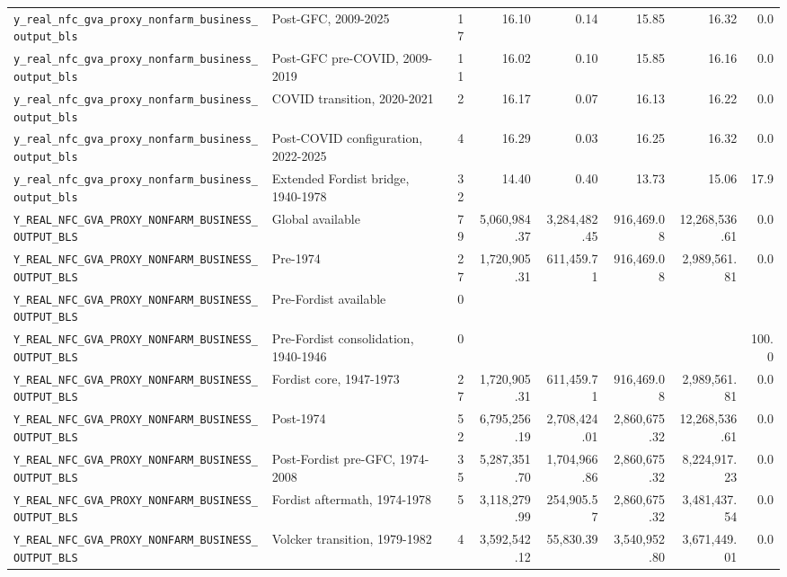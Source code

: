 \begin{landscape}
\begin{longtable}{p{4.4cm}p{3.8cm}rrrrrr}
\\
\nolinkurl{y_real_nfc_gva_proxy_nonfarm_business_output_bls} & Post-GFC, 2009-2025 & 17 & 16.10 & 0.14 & 15.85 & 16.32 & 0.0
\\
\nolinkurl{y_real_nfc_gva_proxy_nonfarm_business_output_bls} & Post-GFC pre-COVID, 2009-2019 & 11 & 16.02 & 0.10 & 15.85 & 16.16 & 0.0
\\
\nolinkurl{y_real_nfc_gva_proxy_nonfarm_business_output_bls} & COVID transition, 2020-2021 & 2 & 16.17 & 0.07 & 16.13 & 16.22 & 0.0
\\
\nolinkurl{y_real_nfc_gva_proxy_nonfarm_business_output_bls} & Post-COVID configuration, 2022-2025 & 4 & 16.29 & 0.03 & 16.25 & 16.32 & 0.0
\\
\nolinkurl{y_real_nfc_gva_proxy_nonfarm_business_output_bls} & Extended Fordist bridge, 1940-1978 & 32 & 14.40 & 0.40 & 13.73 & 15.06 & 17.9
\\
\nolinkurl{Y_REAL_NFC_GVA_PROXY_NONFARM_BUSINESS_OUTPUT_BLS} & Global available & 79 & 5,060,984.37 & 3,284,482.45 & 916,469.08 & 12,268,536.61 & 0.0
\\
\nolinkurl{Y_REAL_NFC_GVA_PROXY_NONFARM_BUSINESS_OUTPUT_BLS} & Pre-1974 & 27 & 1,720,905.31 & 611,459.71 & 916,469.08 & 2,989,561.81 & 0.0
\\
\nolinkurl{Y_REAL_NFC_GVA_PROXY_NONFARM_BUSINESS_OUTPUT_BLS} & Pre-Fordist available & 0 &  &  &  &  &
\\
\nolinkurl{Y_REAL_NFC_GVA_PROXY_NONFARM_BUSINESS_OUTPUT_BLS} & Pre-Fordist consolidation, 1940-1946 & 0 &  &  &  &  & 100.0
\\
\nolinkurl{Y_REAL_NFC_GVA_PROXY_NONFARM_BUSINESS_OUTPUT_BLS} & Fordist core, 1947-1973 & 27 & 1,720,905.31 & 611,459.71 & 916,469.08 & 2,989,561.81 & 0.0
\\
\nolinkurl{Y_REAL_NFC_GVA_PROXY_NONFARM_BUSINESS_OUTPUT_BLS} & Post-1974 & 52 & 6,795,256.19 & 2,708,424.01 & 2,860,675.32 & 12,268,536.61 & 0.0
\\
\nolinkurl{Y_REAL_NFC_GVA_PROXY_NONFARM_BUSINESS_OUTPUT_BLS} & Post-Fordist pre-GFC, 1974-2008 & 35 & 5,287,351.70 & 1,704,966.86 & 2,860,675.32 & 8,224,917.23 & 0.0
\\
\nolinkurl{Y_REAL_NFC_GVA_PROXY_NONFARM_BUSINESS_OUTPUT_BLS} & Fordist aftermath, 1974-1978 & 5 & 3,118,279.99 & 254,905.57 & 2,860,675.32 & 3,481,437.54 & 0.0
\\
\nolinkurl{Y_REAL_NFC_GVA_PROXY_NONFARM_BUSINESS_OUTPUT_BLS} & Volcker transition, 1979-1982 & 4 & 3,592,542.12 & 55,830.39 & 3,540,952.80 & 3,671,449.01 & 0.0
\\

\end{longtable}
\end{landscape}
